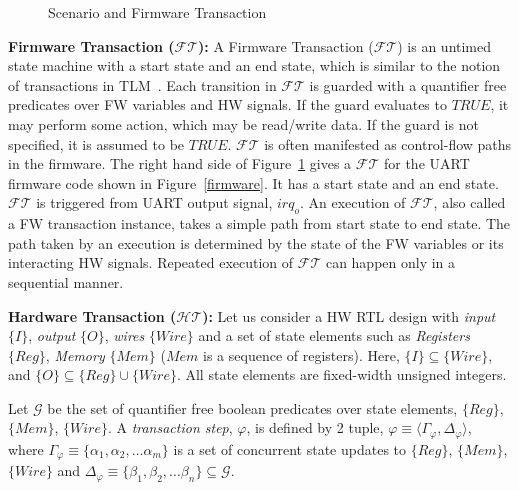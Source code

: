 \documentclass[sigconf]{acmart}
\newcommand{\Omit}[1]{}
\begin{document}
\Omit{ 
\textbf{Use case:}
A {\em Use case} is a set of scenarios that satisfy 
a particular goal. A use case completes successfully 
when that goal is satisfied. A complete set of use cases 
defines all the behaviors required of the system. For example, 
a use case in case of UART IP may be to transmit 
the data through the serial port. A scenario is an 
instance of a use case. 
}
%
\begin{figure}[t]
\caption{Scenario and Firmware Transaction
\label{fig:st}}
\end{figure}

\textbf{Firmware Transaction ($\mathcal{FT}$):} 
A Firmware Transaction ($\mathcal{FT}$) is an untimed state machine 
with a start state and an end state, which is similar to the notion of 
transactions in TLM~\cite{codes14}. 
Each transition in $\mathcal{FT}$ is guarded with a quantifier free predicates
over FW variables and HW signals.
If the guard evaluates to $TRUE$, it may perform some action, which may be 
read/write data. If the guard is not specified, it is assumed to be $TRUE$.
$\mathcal{FT}$ is often manifested as control-flow paths in the firmware. 
The right hand side of Figure~\ref{fig:st} gives a 
$\mathcal{FT}$ for the UART firmware code shown in Figure~\ref{firmware}. 
It has a start state and an end state. $\mathcal{FT}$ is triggered from 
UART output signal, $irq_o$. An execution of $\mathcal{FT}$, also called a 
FW transaction instance, takes a simple path from start state to end state. 
The path taken by an execution is determined by the state of 
the FW variables or its interacting HW signals. Repeated execution of 
$\mathcal{FT}$ can happen only in a sequential manner.  
 
\textbf{Hardware Transaction ($\mathcal{HT}$):} 
Let us consider a HW RTL design with \textit{input} $\{I\}$, 
\textit{output} $\{O\}$, \textit{wires} $\{Wire\}$ and a set of 
state elements such as \textit{Registers} $\{Reg\}$, \textit{Memory}
$\{Mem\}$ ($Mem$ is a sequence of registers). Here, 
$\{I\} \subseteq \{Wire\}$, and $\{O\} \subseteq \{Reg\} \cup \{Wire\}$.
All state elements are fixed-width unsigned integers. 

Let $\mathcal{G}$ be the set of quantifier free boolean predicates over 
state elements, $\{Reg\}$, $\{Mem\}$, $\{Wire\}$.  
A {\em transaction step}, $\varphi$, is defined by 2 tuple,
$\varphi \equiv \langle \Gamma_{\varphi}, \Delta_{\varphi} \rangle$, where 
$\Gamma_{\varphi} \equiv \{\alpha_1, \alpha_2, \ldots \alpha_{m}\}$
is a set of concurrent state updates to $\{Reg\}$, $\{Mem\}$, $\{Wire\}$ 
and $\Delta_{\varphi} \equiv \{\beta_1, \beta_2, \ldots \beta_{n}\} \subseteq
\mathcal{G}$.
\end{document}
